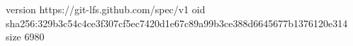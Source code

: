 version https://git-lfs.github.com/spec/v1
oid sha256:329b3c54c4ce3f307cf5ec7420d1e67c89a99b3ce388d6645677b1376120e314
size 6980
